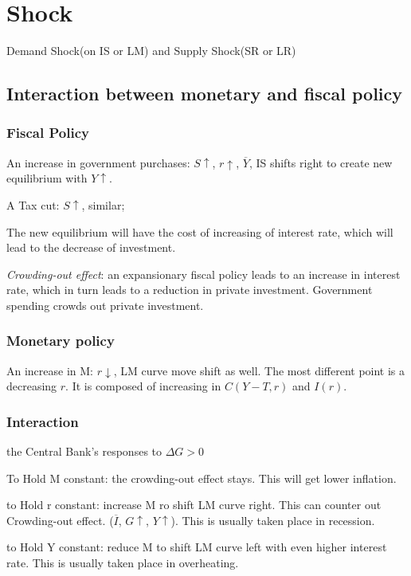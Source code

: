 \documentclass[10pt, a4paper]{article}
\begin{document}
\section{Shock}
    Demand Shock(on IS or LM) and Supply Shock(SR or LR)
    \subsection{Interaction between monetary and fiscal policy}
        \subsubsection{Fiscal Policy}
               An increase in government purchases: $S\uparrow$, $r\uparrow$, $\overline{Y}$, IS shifts right to create new equilibrium with $Y\uparrow$.
            
            A Tax cut: $S\uparrow$, similar;
            
            The new equilibrium will have the cost of increasing of interest rate, which will lead to the decrease of investment. 
            
            \emph{Crowding-out effect}: an expansionary fiscal policy leads to an increase in interest rate, which in turn leads to a reduction in private investment. Government spending crowds out private investment. 
        
        \subsubsection{Monetary policy}
            An increase in M: $r\downarrow$, LM curve move shift as well. The most different point is a decreasing $r$. It is composed of increasing in $C(Y-T, r)$ and $I(r)$.
        \subsubsection{Interaction} 
            the Central Bank's responses to $\Delta G > 0$ 
            
            \quad To Hold M constant: the crowding-out effect stays. This will get lower inflation. 
            
            \quad to Hold r constant: increase M ro shift LM curve right. This can counter out Crowding-out effect. ($\overline{I}$, $G\uparrow$,  $Y\uparrow$). This is usually taken place in recession.

            \quad to Hold Y constant: reduce M to shift LM curve left with even higher interest rate. This is usually taken place in overheating. 
\end{document}
